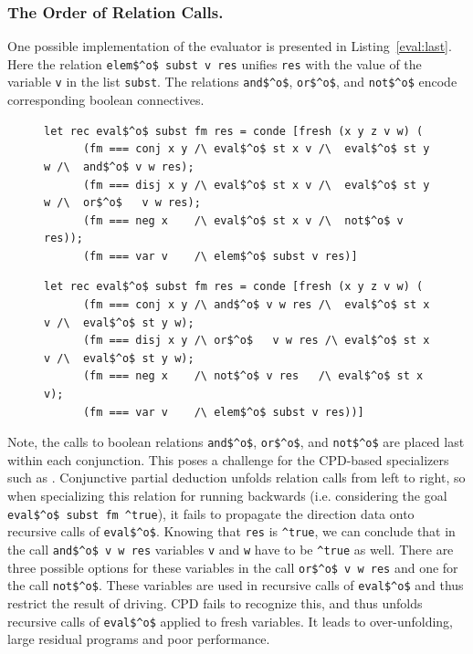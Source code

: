 \subsubsection{The Order of Relation Calls.}

One possible implementation of the evaluator is presented in Listing~\ref{eval:last}.
Here the relation \lstinline{elem$^o$ subst v res} unifies \lstinline{res} with the value of the variable \lstinline{v} in the list \lstinline{subst}.
The relations \lstinline{and$^o$}, \lstinline{or$^o$}, and \lstinline{not$^o$} encode corresponding boolean connectives.

\begin{figure}[!t]
  \centering
  \begin{minipage}{0.95\textwidth}
    \begin{lstlisting}[label={eval:last}, caption={Evaluator of formulas with boolean operation last}, captionpos=b, frame=tb]
  let rec eval$^o$ subst fm res = conde [fresh (x y z v w) (
      (fm === conj x y /\ eval$^o$ st x v /\  eval$^o$ st y w /\  and$^o$ v w res);
      (fm === disj x y /\ eval$^o$ st x v /\  eval$^o$ st y w /\  or$^o$   v w res);
      (fm === neg x    /\ eval$^o$ st x v /\  not$^o$ v res));
      (fm === var v    /\ elem$^o$ subst v res)]
    \end{lstlisting}
  \end{minipage}
  \begin{minipage}{0.95\textwidth}
    \begin{lstlisting}[label={eval:fst}, caption={Evaluator of formulas with boolean operation second}, captionpos=b, frame=tb]
  let rec eval$^o$ subst fm res = conde [fresh (x y z v w) (
      (fm === conj x y /\ and$^o$ v w res /\  eval$^o$ st x v /\  eval$^o$ st y w);
      (fm === disj x y /\ or$^o$   v w res /\ eval$^o$ st x v /\  eval$^o$ st y w);
      (fm === neg x    /\ not$^o$ v res   /\ eval$^o$ st x v);
      (fm === var v    /\ elem$^o$ subst v res))]
    \end{lstlisting}
  \end{minipage}
\end{figure}

Note, the calls to boolean relations \lstinline{and$^o$}, \lstinline{or$^o$}, and \lstinline{not$^o$} are placed last within each conjunction.
This poses a challenge for the CPD-based specializers such as \ecce.
Conjunctive partial deduction unfolds relation calls from left to right, so when specializing this relation for running backwards (i.e. considering the goal \lstinline{eval$^o$ subst fm ^true}), it fails to propagate the direction data onto recursive calls of \lstinline{eval$^o$}.
Knowing that \lstinline{res} is \lstinline{^true}, we can conclude that in the call \lstinline{and$^o$ v w res} variables \lstinline{v} and \lstinline{w} have to be \lstinline{^true} as well.
There are three possible options for these variables in the call \lstinline{or$^o$ v w res} and one for the call \lstinline{not$^o$}.
These variables are used in recursive calls of \lstinline{eval$^o$} and thus restrict the result of driving.
CPD fails to recognize this, and thus unfolds recursive calls of \lstinline{eval$^o$} applied to fresh variables.
It leads to over-unfolding, large residual programs and poor performance.

